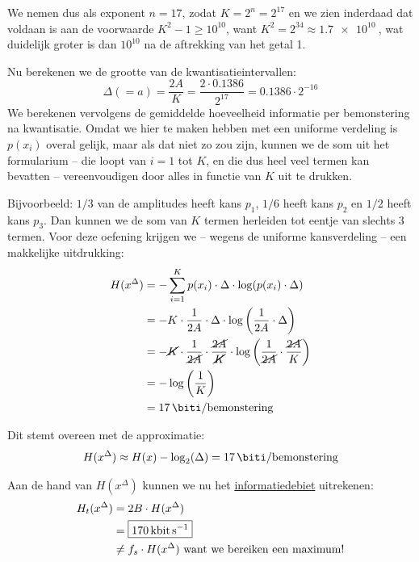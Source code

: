 \documentclass[kulak]{kulakarticle}
\begin{document}
\begin{enumerate}
\begin{itemize}
			We nemen dus als exponent \(n=17\), zodat \( K=2^n=2^{17} \) en we zien inderdaad dat voldaan is aan de voorwaarde \( K^2-1\geq 10^{10} \), want \( K^2=2^{34} \approx \SI{1.7e10}{} \), wat duidelijk groter is dan \(10^{10}\) na de aftrekking van het getal 1.

			 Nu berekenen we de grootte van de kwantisatieintervallen: \[
			\Delta (=a) = \frac{2A}{K} = \dfrac{2\cdot 0.1386}{2^{17}} = 0.1386 \cdot 2^{-16}
			\]We berekenen vervolgens de gemiddelde hoeveelheid informatie per bemonstering na kwantisatie. Omdat we hier te maken hebben met een uniforme verdeling is \(p(x_i)\) overal gelijk, maar als dat niet zo zou zijn, kunnen we de som uit het formularium -- die loopt van \(i=1\) tot \(K\), en die dus heel veel termen kan bevatten -- vereenvoudigen door alles in functie van \(K\) uit te drukken.

			Bijvoorbeeld: \(1/3\) van de amplitudes heeft kans \(p_1\), \(1/6\) heeft kans \(p_2\) en \(1/2\) heeft kans \(p_3\). Dan kunnen we de som van \(K\) termen herleiden tot eentje van slechts \(3\) termen. Voor deze oefening krijgen we -- wegens de uniforme kansverdeling -- een makkelijke uitdrukking: \begin{align*}
				H(x^{\Delta}) &= - \sum_{i=1}^{K} p(x_i) \cdot \Delta \cdot \log(p(x_i)\cdot \Delta) \\
				&= - K \cdot \frac{1}{2A} \cdot \Delta \cdot \log\left(\frac{1}{2A} \cdot \Delta \right)\\
				& = - \cancel{K} \cdot \frac{1}{\cancel{2A}} \cdot \frac{\cancel{2A}}{\cancel{K}} \cdot \log\left(\frac{1}{\cancel{2A}} \cdot \frac{\cancel{2A}}{K} \right)\\
				&= -\log\left(\frac{1}{K}\right)\\
				&= \SI{17}{\biti \per bemonstering}
			\end{align*}

			Dit stemt overeen met de approximatie:
			\[
			H(x^{\Delta}) \approx H(x)-\log_2(\Delta) = \SI{17}{\biti \per bemonstering}
			\]

			Aan de hand van \( H(x^{\Delta}) \) kunnen we nu het \underline{informatiedebiet} uitrekenen: \begin{align*}
				H_{t}(x^{\Delta}) &= 2B \cdot H(x^{\Delta}) \\
				&= \boxed{\SI{170}{\kilo \bit \per \second}} \\
				&\neq f_s \cdot H(x^{\Delta}) \text{ want we bereiken een maximum!}
			\end{align*}


\end{itemize}
\end{enumerate}
\end{document}
